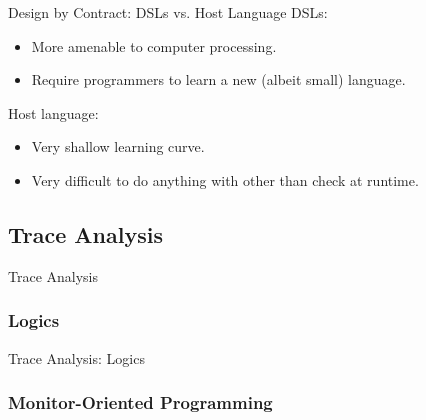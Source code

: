 \documentclass[12pt]{beamer}
\begin{document}
\begin{frame}{Design by Contract: \small DSLs vs. Host Language}
  DSLs:

  \begin{itemize}
    \item More amenable to computer processing.
    \item Require programmers to learn a new (albeit small) language.
  \end{itemize}

  \vspace{0.25cm}

  Host language:

  \begin{itemize}
    \item Very shallow learning curve.
    \item Very difficult to do anything with other than check at
      runtime.
  \end{itemize}
\end{frame}


\subsection{Trace Analysis}
\label{sec:runver-trace}

\begin{frame}{Trace Analysis}

\end{frame}

\subsubsection{Logics}
\label{sec:runver-trace-log}

\begin{frame}{Trace Analysis: Logics}

\end{frame}

\subsubsection{Monitor-Oriented Programming}
\label{sec:runver-trace-mop}
\end{document}
